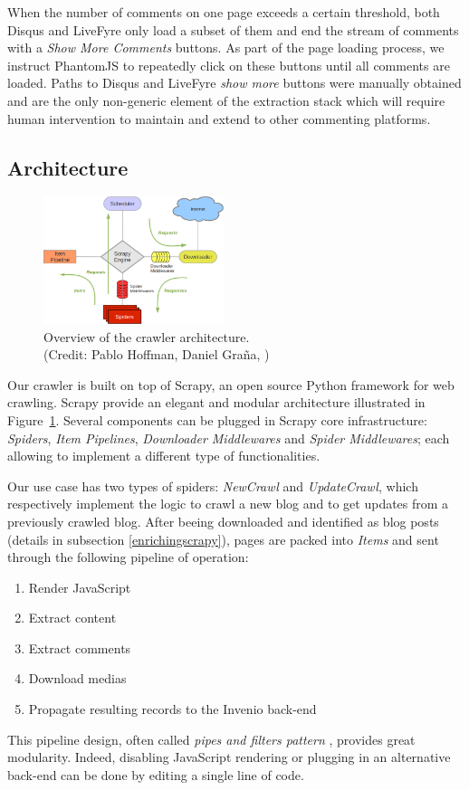 When the number of comments on one page exceeds a certain threshold, both Disqus and LiveFyre only load a subset of them and end the stream of comments with a \emph{Show More Comments} buttons. As part of the page loading process, we instruct PhantomJS to repeatedly click on these buttons until all comments are loaded. Paths to Disqus and LiveFyre \emph{show more} buttons were manually obtained and are the only non-generic element of the extraction stack which will require human intervention to maintain and extend to other commenting platforms.


\subsection{Architecture}

\begin{figure}
  \capstart
  \centering
  \includegraphics[width=0.47\textwidth]{img/scrapy_architecture.png}
  \caption{Overview of the crawler architecture.\\(Credit: Pablo Hoffman, Daniel Graña, \cite{scrapy2013})}
  \label{architecture}
\end{figure}

Our crawler is built on top of Scrapy\cite{scrapy2013}, an open source Python framework for web crawling. Scrapy provide an elegant and modular architecture illustrated in Figure~\ref{architecture}. Several components can be plugged in Scrapy core infrastructure: \emph{Spiders}, \emph{Item Pipelines}, \emph{Downloader Middlewares} and \emph{Spider Middlewares}; each allowing to implement a different type of functionalities.

Our use case has two types of spiders: \emph{NewCrawl} and \emph{UpdateCrawl}, which respectively implement the logic to crawl a new blog and to get updates from a previously crawled blog. After beeing downloaded and identified as blog posts (details in subsection \ref{enrichingscrapy}), pages are packed into \emph{Items} and sent through the following pipeline of operation:
\begin{enumerate}[noitemsep]
  \item Render JavaScript
  \item Extract content
  \item Extract comments
  \item Download medias
  \item Propagate resulting records to the Invenio back-end
\end{enumerate}
This pipeline design, often called \emph{pipes and filters pattern} \cite[Chapter Messaging Systems]{hohpe2003}, provides great modularity. Indeed, disabling JavaScript rendering or plugging in an alternative back-end can be done by editing a single line of code.


